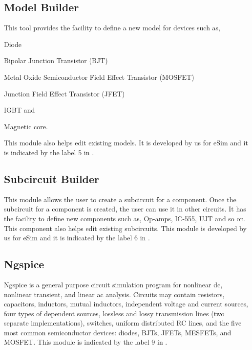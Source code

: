 \subsection {Model Builder} 
This tool provides the facility to define a new model for devices such
as,
\begin{inparaenum}
            \item Diode
            \item Bipolar Junction Transistor (BJT)
            \item Metal Oxide Semiconductor Field Effect Transistor (MOSFET)
            \item Junction Field Effect Transistor (JFET)
            \item IGBT and
            \item Magnetic core.
            \end{inparaenum}
            This module also helps edit existing models.
It is developed by us for eSim and it is indicated by the
label 5 in .
 
\subsection{Subcircuit Builder}  This
module allows the user to create a subcircuit for a component. Once
the subcircuit for a component is created, the user can use it in
other circuits. It has the facility to define new components such as,
Op-amps, IC-555, UJT and so on.  This component also helps edit existing
subcircuits.  This module is developed by us for eSim and it is
indicated by the label 6 in .

\subsection{Ngspice}  \label{sec:ngspice}
Ngspice is a general purpose circuit simulation program for nonlinear
dc, nonlinear transient, and linear ac analysis.
Circuits may contain resistors, capacitors,
inductors, mutual inductors, independent voltage and current sources,
four types of dependent sources, lossless and lossy transmission lines
(two separate implementations), switches, uniform distributed RC
lines, and the five most common semiconductor devices: diodes,
 BJTs,  JFETs, MESFETs,
and MOSFET. 
This module is indicated by the label 9 in .

